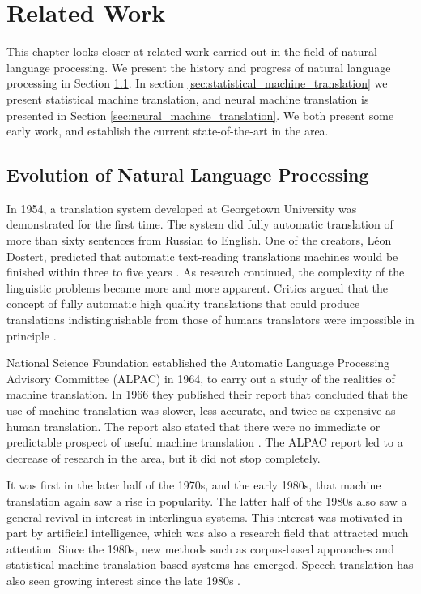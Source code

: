 
\chapter{Related Work}
\label{ch:related_work}
This chapter looks closer at related work carried out in the field of natural language processing. We present the history and progress of natural language processing in Section \ref{sec:natural_language_processing}. In section \ref{sec:statistical_machine_translation} we present statistical machine translation, and neural machine translation is presented in Section \ref{sec:neural_machine_translation}. We both present some early work, and establish the current state-of-the-art in the area.


\section{Evolution of Natural Language Processing}
\label{sec:natural_language_processing}
In 1954, a translation system developed at Georgetown University was demonstrated for the first time. The system did fully automatic translation of more than sixty sentences from Russian to English. One of the creators, Léon Dostert, predicted that automatic text-reading translations machines would be finished within three to five years \citep{hutchins1997first}. As research continued, the complexity of the linguistic problems became more and more apparent. Critics argued that the concept of fully automatic high quality translations that could produce translations indistinguishable from those of humans translators were impossible in principle \citep{hutchins2007machine}. 

National Science Foundation established the Automatic Language Processing Advisory Committee (ALPAC) in 1964, to carry out a study of the realities of machine translation. In 1966 they published their report that concluded that the use of machine translation was slower, less accurate, and twice as expensive as human translation. The report also stated that there were no immediate or predictable prospect of useful machine translation \citep{hutchins2007machine, national1966language, koehn2010statistical}. The ALPAC report led to a decrease of research in the area, but it did not stop completely.

It was first in the later half of the 1970s, and the early 1980s, that machine translation again saw a rise in popularity. The latter half of the 1980s also saw a general revival in interest in interlingua systems. This interest was motivated in part by artificial intelligence, which was also a research field that attracted much attention. Since the 1980s, new methods such as corpus-based approaches and statistical machine translation based systems has emerged. Speech translation has also seen growing interest since the late 1980s \citep{hutchins2007machine}.

